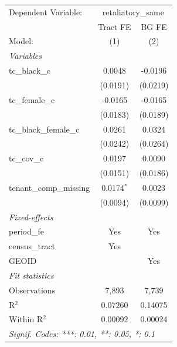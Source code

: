 \begin{tabular}{lcc}
   \tabularnewline \midrule \midrule
   Dependent Variable: & \multicolumn{2}{c}{retaliatory\_same}\\
                           & Tract FE     & BG FE \\   
   Model:                  & (1)          & (2)\\  
   \midrule
   \emph{Variables}\\
   tc\_black\_c            & 0.0048       & -0.0196\\   
                           & (0.0191)     & (0.0219)\\   
   tc\_female\_c           & -0.0165      & -0.0165\\   
                           & (0.0183)     & (0.0189)\\   
   tc\_black\_female\_c    & 0.0261       & 0.0324\\   
                           & (0.0242)     & (0.0264)\\   
   tc\_cov\_c              & 0.0197       & 0.0090\\   
                           & (0.0151)     & (0.0186)\\   
   tenant\_comp\_missing   & 0.0174$^{*}$ & 0.0023\\   
                           & (0.0094)     & (0.0099)\\   
   \midrule
   \emph{Fixed-effects}\\
   period\_fe              & Yes          & Yes\\  
   census\_tract           & Yes          & \\  
   GEOID                   &              & Yes\\  
   \midrule
   \emph{Fit statistics}\\
   Observations            & 7,893        & 7,739\\  
   R$^2$                   & 0.07260      & 0.14075\\  
   Within R$^2$            & 0.00092      & 0.00024\\  
   \midrule \midrule
   \multicolumn{3}{l}{\emph{Signif. Codes: ***: 0.01, **: 0.05, *: 0.1}}\\
\end{tabular}
\par\endgroup
\begingroup
\centering
